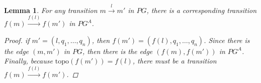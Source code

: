 \documentclass[twocolumn, openany]{sig-alternate-10pt}
\newcommand{\Topo}{\ensuremath{\mathrm{topo}}}
\newtheorem{lem}[thm]{Lemma}
\begin{document}
\newcommand{\trans}[3]{\ensuremath{#1 \overset{#3}{\rightarrow} #2}}


\begin{lem}
  For any transition $\trans{m}{m'}{l}$ in $PG$, there is a corresponding transition $\trans{f(m)}{f(m')}{f(l)}$ in $PG^A$.
  \begin{proof}
    if $m' = (l, q_1, \ldots, q_n)$, then $f(m') = (f(l), q_1, \ldots, q_n)$. Since there is the edge $(m,m')$ in $PG$, then there is the edge $(f(m),f(m'))$ in $PG^A$. Finally, because $\Topo(f(m')) = f(l)$, there must be a transition $\trans{f(m)}{f(m')}{f(l)}$.
  \end{proof}
\end{lem}


\vspace{.4em}
\end{document}
